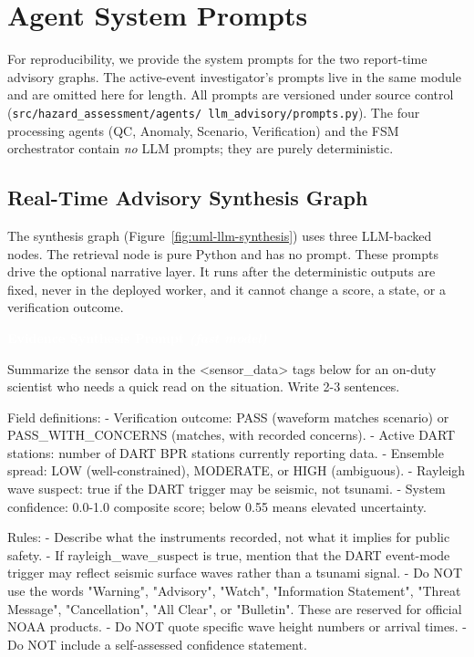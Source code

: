 \documentclass{article}
\newcommand{\promptlabel}[2][black!70]{%
  \begin{tcolorbox}[
    enhanced,
    arc=2.5pt,
    boxrule=0pt,
    colback=#1, colframe=#1,
    rounded corners=northwest, rounded corners=northeast,
    sharp corners=south,
    left=8pt, right=8pt, top=3pt, bottom=3pt,
    after skip=-0.6pt, before skip=10pt,
  ]
  \sffamily\small\bfseries\textcolor{white}{#2}
  \end{tcolorbox}%
}
\begin{document}
\FloatBarrier
\section{Agent System Prompts}
\label{sec:appendix-prompts}

For reproducibility, we provide the system prompts for the two
report-time advisory graphs.  The active-event investigator's prompts
live in the same module and are omitted here for length.  All prompts are versioned under source control
(\texttt{src/\allowbreak hazard\_assessment/\allowbreak agents/\allowbreak
llm\_advisory/\allowbreak prompts.py}).  The four processing agents
(QC, Anomaly, Scenario, Verification) and the FSM orchestrator contain
\emph{no} LLM prompts; they are purely deterministic.

\subsection{Real-Time Advisory Synthesis Graph}

The synthesis graph (Figure~\ref{fig:uml-llm-synthesis}) uses three
LLM-backed nodes.  The retrieval node is pure Python and has no prompt.
These prompts drive the optional narrative layer.  It runs after the
deterministic outputs are fixed, never in the deployed worker, and it
cannot change a score, a state, or a verification outcome.

\promptlabel[promptfast]{Evidence Synthesis Prompt \normalfont\textnormal{\textit{(fast model)}}}
\begin{promptbox}
Summarize the sensor data in the <sensor_data> tags below for an on-duty
scientist who needs a quick read on the situation. Write 2-3 sentences.

Field definitions:
- Verification outcome: PASS (waveform matches scenario) or PASS_WITH_CONCERNS
  (matches, with recorded concerns).
- Active DART stations: number of DART BPR stations currently reporting data.
- Ensemble spread: LOW (well-constrained), MODERATE, or HIGH (ambiguous).
- Rayleigh wave suspect: true if the DART trigger may be seismic, not tsunami.
- System confidence: 0.0-1.0 composite score; below 0.55 means elevated
  uncertainty.

Rules:
- Describe what the instruments recorded, not what it implies for public safety.
- If rayleigh_wave_suspect is true, mention that the DART event-mode trigger
  may reflect seismic surface waves rather than a tsunami signal.
- Do NOT use the words "Warning", "Advisory", "Watch",
  "Information Statement", "Threat Message", "Cancellation",
  "All Clear", or "Bulletin". These are reserved for official NOAA products.
- Do NOT quote specific wave height numbers or arrival times.
- Do NOT include a self-assessed confidence statement.
\end{promptbox}
\end{document}
